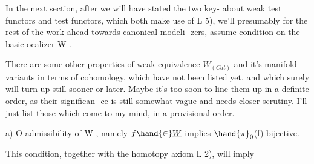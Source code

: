 In the next section,  after we will have stated the two key-
about weak test functors and test functors,  which both make use of L 5),
we'll presumably\hand{,} for the rest of the work ahead towards canonical modeli-%
zers,  assume   condition on the basic ocalizer \underline{W} .

There  are some other properties of weak equivalence $W_{(Cat)}$ and it's
manifold variants in terms of cohomology,  which have not been listed
yet,  and which surely will turn up still sooner or later.  Maybe it's
too soon to line them up in a definite order,  as their  significan-%
ce is still somewhat vague  and needs closer scrutiny.  I'll just list
those which come to my mind,  in a provisional order. 

 a)  O-admissibility of \underline{W} , namely $f \hand{\in} \underline{W}$  implies $\hand{\pi}_0$(f) bijective.

This condition,  together with the homotopy axiom L 2),  will imply

